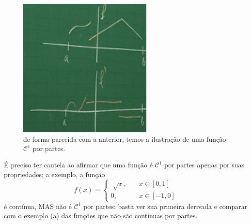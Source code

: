 \documentclass[../pde_notes.tex]{subfiles}
\begin{document}
\begin{figure}[H]
	\begin{center}
		\includegraphics[height=0.6\textheight, width=0.6\textwidth, keepaspectratio]{./Images/lines_09.png}
	\end{center}
	\caption{de forma parecida com a anterior, temos a ilustração de uma função \(\mathcal{C}^{1}\) por partes.}
	\label{lines09}
\end{figure}
É preciso ter cautela ao afirmar que uma função é \(\mathcal{C}^{1}\) por partes apenas por suas propriedades; a exemplo, a função
\[
	f(x) = \left\{\begin{array}{ll}
		\sqrt[]{x}, & \quad x\in [0,1]   \\
		0,          & \quad x\in [-1, 0]
	\end{array}\right.
\]
é contínua, MAS não é \(\mathcal{C}^{1}\) por partes: basta ver sua primeira derivada e comparar com o exemplo (a) das funções que não são contínuas por partes.
\end{document}
